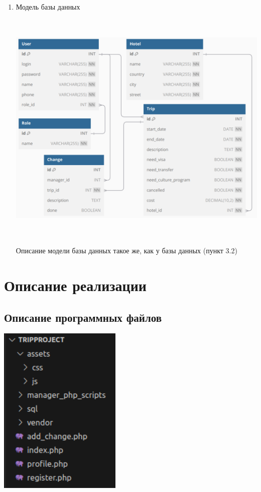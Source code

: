 \documentclass[a4paper,12pt]{article}
\begin{document}
\begin{enumerate}
    \item Модель базы данных

          \includegraphics[width=6.010415573053368in, height=4.5in]{media/base_model.png}

          Описание модели базы данных такое же, как у базы данных (пункт 3.2)
\end{enumerate}

\section{Описание реализации}

\subsection{Описание программных файлов}

\includegraphics[width=2.317518591426072in, height=3.1979166666666665in]{media/files_description.png}
\end{document}
